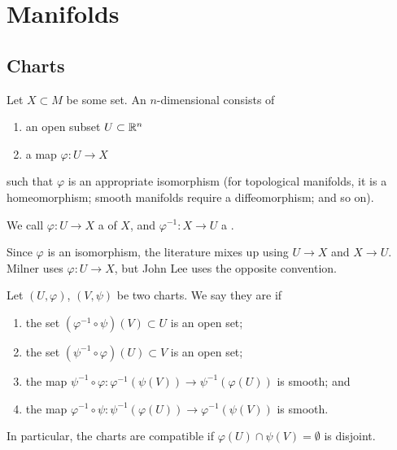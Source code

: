 \section{Manifolds}
\subsection{Charts}
\begin{definition}
  Let $X\subset M$ be some set. An $n$-dimensional  consists of
  \begin{enumerate}
  \item an open subset $U\subset\mathbb{R}^{n}$
  \item a map $\varphi\colon U\to X$
  \end{enumerate}
  such that $\varphi$ is an appropriate isomorphism (for topological
  manifolds, it is a homeomorphism; smooth manifolds require a
  diffeomorphism; and so on).
\end{definition}

\begin{remark}
  We call $\varphi\colon U\to X$ a  of $X$, and
  $\varphi^{-1}\colon X\to U$ a .
\end{remark}

\begin{remark}
  Since $\varphi$ is an isomorphism, the literature mixes up using $U\to X$
  and $X\to U$. Milner uses $\varphi\colon U\to X$, but John Lee uses
  the opposite convention.
\end{remark}

\begin{definition}
  Let $(U,\varphi)$, $(V,\psi)$ be two charts. We say they are
   if
  \begin{enumerate}
  \item the set $(\varphi^{-1}\circ\psi)(V)\subset U$ is an open set;
  \item the set $(\psi^{-1}\circ\varphi)(U)\subset V$ is an open set;
  \item the map $\psi^{-1}\circ\varphi\colon\varphi^{-1}(\psi(V))\to\psi^{-1}(\varphi(U))$
    is smooth; and
  \item the map $\varphi^{-1}\circ\psi\colon\psi^{-1}(\varphi(U))\to\varphi^{-1}(\psi(V))$
    is smooth.
  \end{enumerate}
  In particular, the charts are compatible if
  $\varphi(U)\cap\psi(V)=\emptyset$ is disjoint.
\end{definition}

